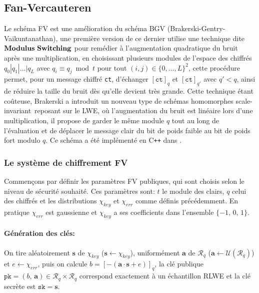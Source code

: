 \documentclass[11pt, headsepline, a4paper, fleqn, oneside]{article}
\begin{document}
\subsection{Fan-Vercauteren}
Le schéma FV est une amélioration du schéma BGV (Brakerski-Gentry-Vaikuntanathan), une première version de ce dernier utilise une technique dite $\bold{Modulus \ Switching}$ pour remédier à l'augmentation quadratique du bruit après une multiplication, en choisissant plusieurs modules de l'espace des chiffrés $q_{0}\left|q_{1}\right| \ldots | q_{L}$ avec $q_{i} \equiv q_{j} \bmod t$ pour tout $(i, j) \in\{0, \ldots, L\}^{2}$, cette procédure permet, pour un message chiffré \texttt{ct}, d'échanger $[\texttt{ct}]_q$ et $[\texttt{ct}]_{q'}$ avec $q'<q$, ainsi de réduire la taille du bruit dès qu'elle devient très grande. Cette technique étant coûteuse, Brakerski a introduit un nouveau type de schémas homomorphes \og scale-invariant\fg \ reposant sur le LWE, où l'augmentation du bruit est linéaire lors d'une multiplication, il propose de garder le même module $q$ tout au long de l'évaluation et de déplacer le message clair du bit de poids faible au bit de poids fort modulo $q$. Ce schéma a été implémenté en C\texttt{++} dans \cite{sealcrypto,Cingulata,FV-NFLlib}.

\subsubsection{Le système de chiffrement FV}
Commençons par définir les paramètres FV publiques, qui sont choisis selon le niveau de sécurité souhaité. Ces paramètres sont: $t$ le module des clairs, $q$ celui des chiffrés et les distributions $\chi_{key}$ et $\chi_{err}$ comme définis précédemment. En pratique $\chi_{err}$ est gaussienne et $\chi_{key}$ a ses coefficients dans l'ensemble $\{-1,\,0,\,1\}$.

\paragraph{Génération des clés:}
On tire aléatoirement $\boldsymbol{s}$ de $\chi_{key}$ ($\boldsymbol{s}\leftarrow \chi_{key}$), uniformément $\boldsymbol{a}$ de $\mathcal{R}_q$ ($\boldsymbol{a}\leftarrow \mathcal{U}(\mathcal{R}_q)$) et $e \leftarrow \chi_{err}$, puis on calcule $b=[-(\boldsymbol{a}\cdot \boldsymbol{s} +e)]_{q}$, la clé publique $\texttt{pk}=(b,\,\boldsymbol{a}) \in \mathcal{R}_{q} \times \mathcal{R}_{q}$ correspond exactement à un échantillon RLWE et la clé secrète est $\texttt{sk}=\boldsymbol{s}$.
\end{document}
